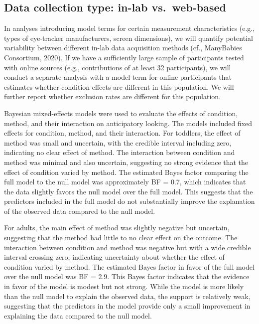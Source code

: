 \documentclass[
  man, donotrepeattitle,floatsintext]{apa6}
\begin{document}
\subsection{Data collection type: in-lab vs.~web-based}\label{data-collection-type-in-lab-vs.-web-based}

In analyses introducing model terms for certain measurement characteristics (e.g., types of eye-tracker manufacturers, screen dimensions), we will quantify potential variability between different in-lab data acquisition methods (cf., ManyBabies Consortium, 2020). If we have a sufficiently large sample of participants tested with online sources (e.g., contributions of at least 32 participants), we will conduct a separate analysis with a model term for online participants that estimates whether condition effects are different in this population. We will further report whether exclusion rates are different for this population.

Bayesian mixed-effects models were used to evaluate the effects of condition, method, and their interaction on anticipatory looking. The models included fixed effects for condition, method, and their interaction. For toddlers, the effect of method was small and uncertain, with the credible interval including zero, indicating no clear effect of method. The interaction between condition and method was minimal and also uncertain, suggesting no strong evidence that the effect of condition varied by method. The estimated Bayes factor comparing the full model to the null model was approximately BF = 0.7, which indicates that the data slightly favors the null model over the full model. This suggests that the predictors included in the full model do not substantially improve the explanation of the observed data compared to the null model.

For adults, the main effect of method was slightly negative but uncertain, suggesting that the method had little to no clear effect on the outcome. The interaction between condition and method was negative but with a wide credible interval crossing zero, indicating uncertainty about whether the effect of condition varied by method. The estimated Bayes factor in favor of the full model over the null model was BF = 2.9. This Bayes factor indicates that the evidence in favor of the model is modest but not strong. While the model is more likely than the null model to explain the observed data, the support is relatively weak, suggesting that the predictors in the model provide only a small improvement in explaining the data compared to the null model.
\end{document}
